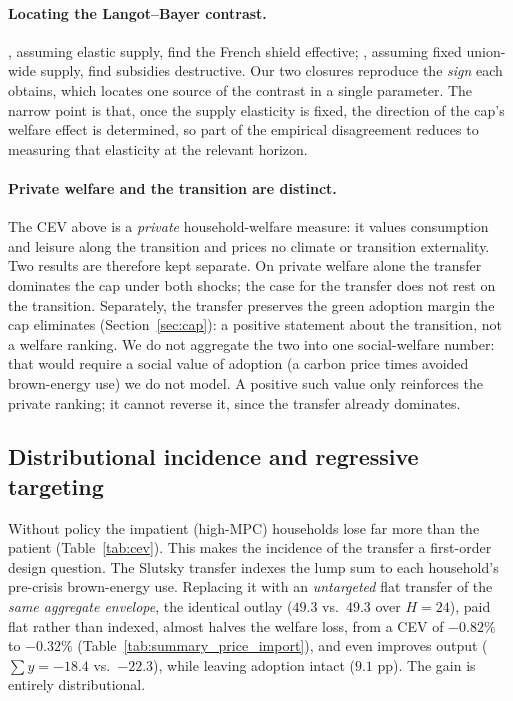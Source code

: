 \paragraph{Locating the Langot--Bayer contrast.} \citet{Langot2026},
assuming elastic supply, find the French shield effective; \citet{Bayer2026},
assuming fixed union-wide supply, find subsidies destructive. Our two closures
reproduce the \emph{sign} each obtains, which locates one source of the contrast
in a single parameter. The narrow point is that, once the supply elasticity is fixed, the direction of the
cap's welfare effect is determined, so part of the empirical disagreement reduces
to measuring that elasticity at the relevant horizon.

\paragraph{Private welfare and the transition are distinct.} The CEV above is a
\emph{private} household-welfare measure: it values consumption and leisure along
the transition and prices no climate or transition externality. Two results are
therefore kept separate. On private welfare alone the transfer dominates the cap
under both shocks; the case for the transfer does not rest on the transition.
Separately, the transfer preserves the green adoption margin the cap eliminates
(Section~\ref{sec:cap}): a positive statement about the transition, not a welfare
ranking. We do not aggregate the two into one social-welfare number: that would
require a social value of adoption (a carbon price times avoided brown-energy use)
we do not model. A positive such value only reinforces the private ranking; it
cannot reverse it, since the transfer already dominates.

\subsection{Distributional incidence and regressive targeting}
\label{sec:flat}

Without policy the impatient (high-MPC) households lose far more than the patient
(Table~\ref{tab:cev}). This makes the incidence of the transfer a first-order
design question. The Slutsky transfer indexes the lump sum to each household's
pre-crisis brown-energy use. Replacing it with an \emph{untargeted} flat transfer
of the \emph{same aggregate envelope}, the identical outlay ($49.3$ vs.\ $49.3$
over $H=24$), paid flat rather than indexed, almost halves the welfare loss, from
a CEV of $-0.82\%$ to $-0.32\%$ (Table~\ref{tab:summary_price_import}), and even
improves output ($\sum y=-18.4$ vs.\ $-22.3$), while leaving adoption intact
($9.1$ pp). The gain is entirely distributional.

